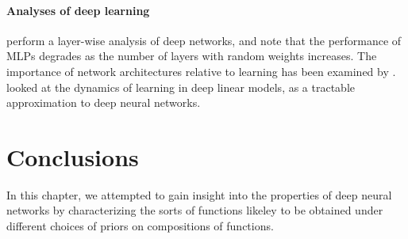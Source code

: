 \paragraph{Analyses of deep learning}
\cite{montavon2010layer} perform a layer-wise analysis of deep networks, and note that the performance of MLPs degrades as the number of layers with random weights increases.
The importance of network architectures relative to learning has been examined by \cite{saxe2011random}.
\cite{saxedynamics} looked at the dynamics of learning in deep linear models, as a tractable approximation to deep neural networks.  











\section{Conclusions}


In this chapter, we attempted to gain insight into the properties of deep neural networks by characterizing the sorts of functions likeley to be obtained under different choices of priors on compositions of functions.

